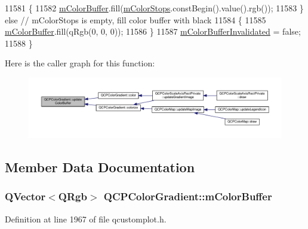\begin{DoxyCode}
11581   \{
11582     \hyperlink{class_q_c_p_color_gradient_af8b5f0739faa5f8295154d47ce38ecff}{mColorBuffer}.fill(\hyperlink{class_q_c_p_color_gradient_a9e11a2b0974ef289d12c324822bc3a3e}{mColorStops}.constBegin().value().rgb());
11583   \} \textcolor{keywordflow}{else} \textcolor{comment}{// mColorStops is empty, fill color buffer with black}
11584   \{
11585     \hyperlink{class_q_c_p_color_gradient_af8b5f0739faa5f8295154d47ce38ecff}{mColorBuffer}.fill(qRgb(0, 0, 0));
11586   \}
11587   \hyperlink{class_q_c_p_color_gradient_abacf55e11f67d6722a687af1bb2687bd}{mColorBufferInvalidated} = \textcolor{keyword}{false};
11588 \}
\end{DoxyCode}


Here is the caller graph for this function\+:\nopagebreak
\begin{figure}[H]
\begin{center}
\leavevmode
\includegraphics[width=350pt]{class_q_c_p_color_gradient_a353f15ab3ab586eebf1f6b58c3e2707b_icgraph}
\end{center}
\end{figure}




\subsection{Member Data Documentation}
\hypertarget{class_q_c_p_color_gradient_af8b5f0739faa5f8295154d47ce38ecff}{}
\subsubsection[{m\+Color\+Buffer}]{\setlength{\rightskip}{0pt plus 5cm}Q\+Vector$<$Q\+Rgb$>$ Q\+C\+P\+Color\+Gradient\+::m\+Color\+Buffer\hspace{0.3cm}{\ttfamily [protected]}}\label{class_q_c_p_color_gradient_af8b5f0739faa5f8295154d47ce38ecff}


Definition at line 1967 of file qcustomplot.\+h.



